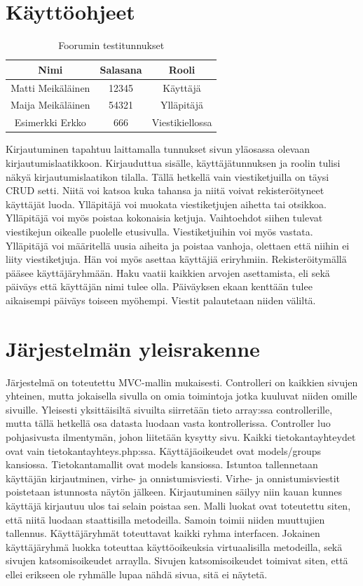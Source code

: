 \documentclass[a4paper, 12pt, finnish]{article}
\begin{document}
\section{Käyttöohjeet}
\begin{table}[ht]
\caption{Foorumin testitunnukset}
\centering
\begin{tabular}{c|c|c}
\hline
Nimi & Salasana & Rooli \\ [0.5ex]
\hline
Matti Meikäläinen&12345&Käyttäjä \\
Maija Meikäläinen&54321&Ylläpitäjä \\
Esimerkki Erkko&666&Viestikiellossa \\ [1ex]
\hline
\end{tabular}
\end{table}

Kirjautuminen tapahtuu laittamalla tunnukset sivun yläosassa olevaan kirjautumislaatikkoon.
Kirjauduttua sisälle, käyttäjätunnuksen ja roolin tulisi näkyä kirjautumislaatikon tilalla.
Tällä hetkellä vain viestiketjuilla on täysi CRUD setti.
Niitä voi katsoa kuka tahansa ja niitä voivat rekisteröityneet käyttäjät luoda.
Ylläpitäjä voi muokata viestiketjujen aihetta tai otsikkoa.
Ylläpitäjä voi myös poistaa kokonaisia ketjuja.
Vaihtoehdot siihen tulevat viestikejun oikealle puolelle etusivulla.
Viestiketjuihin voi myös vastata.
Ylläpitäjä voi määritellä uusia aiheita ja poistaa vanhoja, olettaen että niihin ei liity viestiketjuja.
Hän voi myös asettaa käyttäjiä eriryhmiin.
Rekisteröitymällä pääsee käyttäjäryhmään.
Haku vaatii kaikkien arvojen asettamista, eli sekä päiväys että käyttäjän nimi tulee olla.
Päiväyksen ekaan kenttään tulee aikaisempi päiväys toiseen myöhempi.
Viestit palautetaan niiden väliltä.

\section{Järjestelmän yleisrakenne}
Järjestelmä on toteutettu MVC-mallin mukaisesti.
Controlleri on kaikkien sivujen yhteinen, mutta jokaisella sivulla on omia toimintoja jotka kuuluvat niiden omille sivuille.
Yleisesti yksittäisiltä sivuilta siirretään tieto array:ssa controllerille, mutta tällä hetkellä osa datasta luodaan vasta kontrollerissa.
Controller luo pohjasivusta ilmentymän, johon liitetään kysytty sivu.
Kaikki tietokantayhteydet ovat vain tietokantayhteys.php:ssa.
Käyttäjäoikeudet ovat models/groups kansiossa.
Tietokantamallit ovat models kansiossa.
Istuntoa tallennetaan käyttäjän kirjautminen, virhe- ja onnistumisviesti.
Virhe- ja onnistumisviestit poistetaan istunnosta näytön jälkeen.
Kirjautuminen säilyy niin kauan kunnes käyttäjä kirjautuu ulos tai selain poistaa sen.
Malli luokat ovat toteutettu siten, että niitä luodaan staattisilla metodeilla.
Samoin toimii niiden muuttujien tallennus.
Käyttäjäryhmät toteuttavat kaikki ryhma interfacen.
Jokainen käyttäjäryhmä luokka toteuttaa käyttöoikeuksia virtuaalisilla metodeilla, sekä sivujen katsomisoikeudet arraylla.
Sivujen katsomisoikeudet toimivat siten, että ellei erikseen ole ryhmälle lupaa nähdä sivua, sitä ei näytetä.
\end{document}
